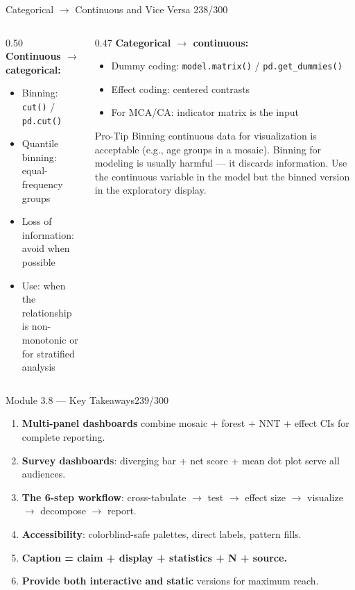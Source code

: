 \documentclass[10pt]{beamer}
\newcommand{\smark}[1]{\hfill{\scriptsize\color{codegray}#1}}
\begin{document}
\begin{frame}{Categorical $\to$ Continuous and Vice Versa}
\smark{238/300}
\begin{columns}[T]
\begin{column}{0.50\textwidth}
    \textbf{Continuous $\to$ categorical:}
    \begin{itemize}
        \item Binning: \texttt{cut()} / \texttt{pd.cut()}
        \item Quantile binning: equal-frequency groups
        \item Loss of information: avoid when possible
        \item Use: when the relationship is non-monotonic or for stratified analysis
    \end{itemize}
\end{column}
\begin{column}{0.47\textwidth}
    \textbf{Categorical $\to$ continuous:}
    \begin{itemize}
        \item Dummy coding: \texttt{model.matrix()} / \texttt{pd.get\_dummies()}
        \item Effect coding: centered contrasts
        \item For MCA/CA: indicator matrix is the input
    \end{itemize}
    \vspace{0.1cm}
    \begin{alertblock}{Pro-Tip}
        \scriptsize Binning continuous data for visualization is acceptable (e.g., age groups in a mosaic). Binning for modeling is usually harmful --- it discards information. Use the continuous variable in the model but the binned version in the exploratory display.
    \end{alertblock}
\end{column}
\end{columns}
\end{frame}



\begin{frame}{Module 3.8 --- Key Takeaways}\smark{239/300}
\begin{enumerate}
    \item \textbf{Multi-panel dashboards} combine mosaic + forest + NNT + effect CIs for complete reporting.
    \item \textbf{Survey dashboards}: diverging bar + net score + mean dot plot serve all audiences.
    \item \textbf{The 6-step workflow}: cross-tabulate $\to$ test $\to$ effect size $\to$ visualize $\to$ decompose $\to$ report.
    \item \textbf{Accessibility}: colorblind-safe palettes, direct labels, pattern fills.
    \item \textbf{Caption = claim + display + statistics + N + source.}
    \item \textbf{Provide both interactive and static} versions for maximum reach.
\end{enumerate}
\end{frame}
\end{document}
